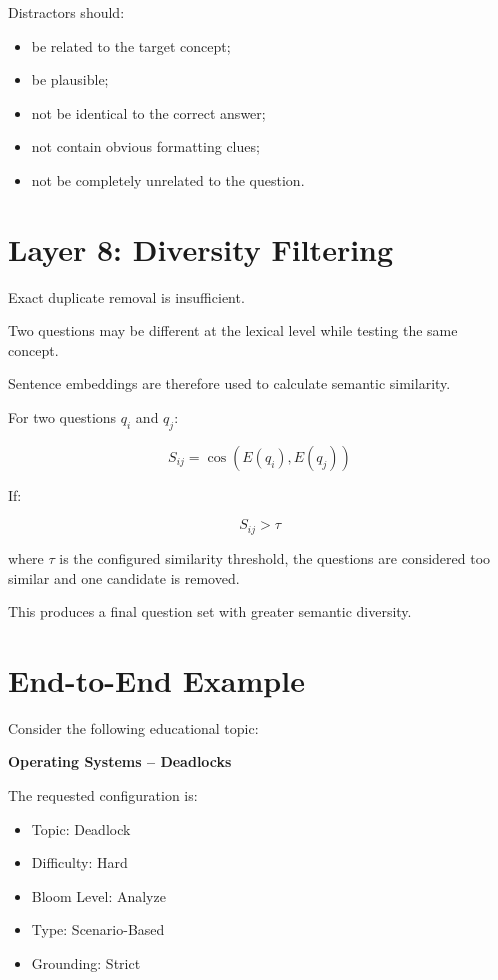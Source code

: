 \documentclass[12pt,a4paper]{report}
\begin{document}
Distractors should:

\begin{itemize}
    \item be related to the target concept;
    \item be plausible;
    \item not be identical to the correct answer;
    \item not contain obvious formatting clues;
    \item not be completely unrelated to the question.
\end{itemize}

\section{Layer 8: Diversity Filtering}

Exact duplicate removal is insufficient.

Two questions may be different at the lexical level while testing the same concept.

Sentence embeddings are therefore used to calculate semantic similarity.

For two questions $q_i$ and $q_j$:

\[
S_{ij}
=
\cos(E(q_i),E(q_j))
\]

If:

\[
S_{ij} > \tau
\]

where $\tau$ is the configured similarity threshold, the questions are considered too similar and one candidate is removed.

This produces a final question set with greater semantic diversity.

\section{End-to-End Example}

Consider the following educational topic:

\begin{center}
\textbf{Operating Systems -- Deadlocks}
\end{center}

The requested configuration is:

\begin{itemize}
    \item Topic: Deadlock
    \item Difficulty: Hard
    \item Bloom Level: Analyze
    \item Type: Scenario-Based
    \item Grounding: Strict
\end{itemize}
\end{document}
